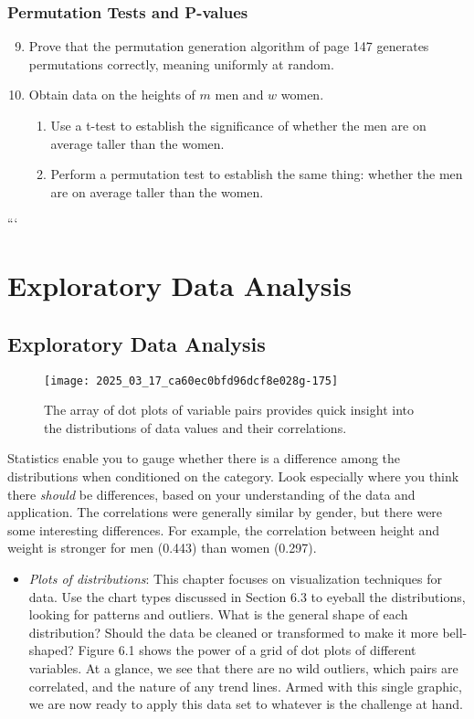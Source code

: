 \documentclass[10pt]{article}
\begin{document}
\subsection*{Permutation Tests and P-values}

\begin{enumerate}
    \setcounter{enumi}{8}
    \item Prove that the permutation generation algorithm of page 147 generates permutations correctly, meaning uniformly at random.

    \item Obtain data on the heights of $m$ men and $w$ women.
    \begin{enumerate}
        \item Use a t-test to establish the significance of whether the men are on average taller than the women.
        \item Perform a permutation test to establish the same thing: whether the men are on average taller than the women.
    \end{enumerate}
\end{enumerate}
```
\chapter{Exploratory Data Analysis}

\section{Exploratory Data Analysis}

\begin{figure}[h]
    \centering
    \texttt{[image: 2025\_03\_17\_ca60ec0bfd96dcf8e028g-175]}
    \caption{The array of dot plots of variable pairs provides quick insight into the distributions of data values and their correlations.}
\end{figure}

Statistics enable you to gauge whether there is a difference among the distributions when conditioned on the category. Look especially where you think there \emph{should} be differences, based on your understanding of the data and application. The correlations were generally similar by gender, but there were some interesting differences. For example, the correlation between height and weight is stronger for men (0.443) than women (0.297).

\begin{itemize}
  \item \emph{Plots of distributions}: This chapter focuses on visualization techniques for data. Use the chart types discussed in Section 6.3 to eyeball the distributions, looking for patterns and outliers. What is the general shape of each distribution? Should the data be cleaned or transformed to make it more bell-shaped? Figure 6.1 shows the power of a grid of dot plots of different variables. At a glance, we see that there are no wild outliers, which pairs are correlated, and the nature of any trend lines. Armed with this single graphic, we are now ready to apply this data set to whatever is the challenge at hand.
\end{itemize}
\end{document}
